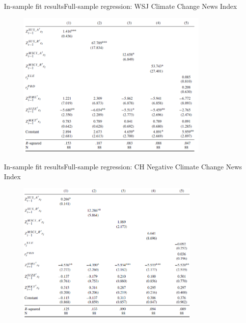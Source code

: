 \begin{frame}{In-sample fit results}{Full-sample regression: WSJ Climate Change News Index}
	\begin{figure}[hbdp]
		\centering
		\includegraphics[width=0.84\textwidth]{tab1.png}
	\end{figure}
\end{frame}

\begin{frame}{In-sample fit results}{Full-sample regression: CH Negative Climate Change News Index}
	\begin{figure}[hbdp]
		\centering
		\includegraphics[width=0.8\textwidth]{tab2.png}
	\end{figure} 
\end{frame}

